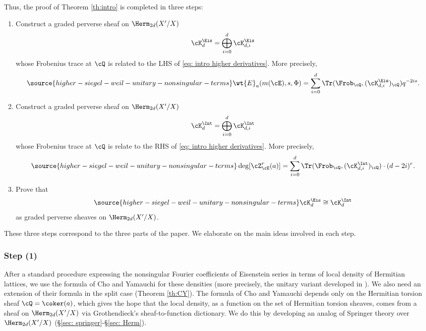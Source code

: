 Thus, the proof of Theorem \ref{th:intro} is completed in three steps:
\begin{enumerate}
\item Construct a graded perverse sheaf on $\Herm_{2d}(X'/X)$
\begin{equation*}
\cK^{\Eis}_{d}=\bigoplus_{i=0}^{d}\cK^{\Eis}_{d,i}
\end{equation*}
whose Frobenius trace at $\cQ$ is related to the LHS of \eqref{eq: intro higher derivatives}. More precisely,
\begin{equation}\label{intro KEis}
\source{higher-siegel-weil-unitary-nonsingular-terms}
\wt{E}_{a}(m(\cE),s, \Phi)= \sum_{i=0}^{d}\Tr(\Frob_{\cQ}, (\cK^{\Eis}_{d,i})_{\cQ})q^{-2is}.
\end{equation}
\item Construct a graded perverse sheaf on $\Herm_{2d}(X'/X)$
\begin{equation*}
\cK^{\Int}_{d}=\bigoplus_{i=0}^{d}\cK^{\Int}_{d,i}
\end{equation*}
whose Frobenius trace at $\cQ$ is relate to the RHS of \eqref{eq: intro higher derivatives}. More precisely,
\begin{equation}\label{intro KInt}
\source{higher-siegel-weil-unitary-nonsingular-terms}
\deg [\cZ_{\cE}^r(a)]=\sum_{i=0}^{d}\Tr(\Frob_{\cQ}, (\cK^{\Int}_{d,i})_{\cQ})\cdot (d-2i)^{r}.
\end{equation}
\item Prove that
\begin{equation}\label{KK}
\source{higher-siegel-weil-unitary-nonsingular-terms}
\cK^{\Eis}_{d}\cong \cK^{\Int}_{d}
\end{equation}
as graded perverse sheaves on $\Herm_{2d}(X'/X)$.
\end{enumerate}

These three steps correspond to the three parts of the paper. We elaborate on the main ideas involved in each step.

\subsubsection{Step (1)} After a standard procedure expressing the nonsingular Fourier coefficients of Eisenstein series in terms of local density of Hermitian lattices, we use the formula of Cho and Yamauchi \cite{CY} for these densities (more precisely, the unitary variant developed in \cite{LZ1}). We also need an extension of their formula in the split case (Theorem \ref{th:CY}). The formula of Cho and Yamauchi depends only on the Hermitian torsion sheaf $\cQ=\coker(a)$, which gives the hope that the local density, as a function on the set of Hermitian torsion sheaves, comes from a sheaf on $\Herm_{2d}(X'/X)$ via Grothendieck's sheaf-to-function dictionary. We do this by developing an analog of Springer theory over  $\Herm_{2d}(X'/X)$ (\S\ref{sec: springer}-\S\ref{sec: Herm}).

